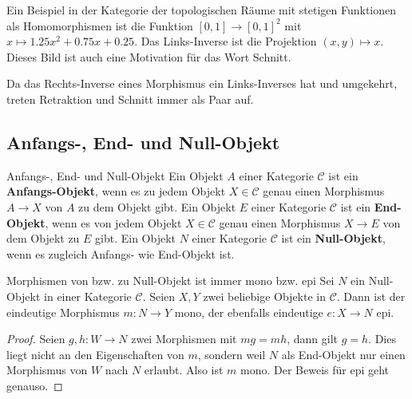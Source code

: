 \documentclass[a4paper]{amsart}
\theoremstyle{definition}
\newcommand{\CC}{\ensuremath{\mathcal{ C }}}
\begin{document}
Ein Beispiel in der Kategorie der topologischen Räume mit stetigen Funktionen als Homomorphismen ist die Funktion $[0,1] \to [0,1]^2$ mit $x \mapsto 1.25 x^2 + 0.75 x + 0.25$. Das Links-Inverse ist die Projektion $(x,y) \mapsto x$. Dieses Bild ist auch eine Motivation für das Wort Schnitt. 


Da das Rechts-Inverse eines Morphismus ein Links-Inverses hat und umgekehrt, treten Retraktion und Schnitt immer als Paar auf.



\subsection{Anfangs-, End- und Null-Objekt}
\begin{Definition}{Anfangs-, End- und Null-Objekt}
   Ein Objekt $A$ einer Kategorie $\CC$ ist ein \textbf{Anfangs-Objekt}, wenn es zu jedem Objekt $X \in \CC$ genau einen Morphismus $A \to X$ von $A$ zu dem Objekt gibt. Ein Objekt $E$ einer Kategorie $\CC$ ist ein \textbf{End-Objekt}, wenn es von jedem Objekt $X \in \CC$ genau einen Morphismus $X \to E$ von dem Objekt zu $E$ gibt. Ein Objekt $N$ einer Kategorie $\CC$ ist ein \textbf{Null-Objekt}, wenn es zugleich Anfangs- wie End-Objekt ist. 
\end{Definition}

\begin{Satz}{Morphismen von bzw. zu Null-Objekt ist immer mono bzw. epi}
   Sei $N$ ein Null-Objekt in einer Kategorie $\CC$. Seien $X, Y$ zwei beliebige Objekte in $\CC$. Dann ist der eindeutige Morphismus $m \colon N \to Y$ mono, der ebenfalls eindeutige $e \colon X \to N$ epi. 
\end{Satz}
\begin{proof}
   Seien $g, h \colon W \to N$ zwei Morphismen mit $mg = mh$, dann gilt $g = h$. Dies liegt nicht an den Eigenschaften von $m$, sondern weil $N$ als End-Objekt nur einen Morphismus von $W$ nach $N$ erlaubt. Also ist $m$ mono. Der Beweis für epi geht genauso.
\end{proof}
\end{document}
